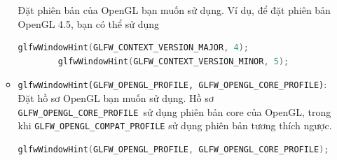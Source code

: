 \begin{enumerate}
\begin{itemize}
      Đặt phiên bản của OpenGL bạn muốn sử dụng. Ví dụ, để đặt phiên bản 
      OpenGL 4.5, bạn có thể sử dụng 
     \begin{lstlisting}[language=C++]
        glfwWindowHint(GLFW_CONTEXT_VERSION_MAJOR, 4);
        glfwWindowHint(GLFW_CONTEXT_VERSION_MINOR, 5);
     \end{lstlisting}
     \item \texttt{glfwWindowHint(GLFW\_OPENGL\_PROFILE,
      GLFW\_OPENGL\_CORE\_PROFILE)}:
      Đặt hồ sơ OpenGL bạn muốn sử dụng. Hồ sơ \texttt{ GLFW\_OPENGL\_CORE\_PROFILE 
      }sử dụng phiên bản core của OpenGL, 
      trong khi \texttt{GLFW\_OPENGL\_COMPAT\_PROFILE} sử dụng phiên bản tương thích
       ngược.
        \begin{lstlisting}[language=C++]
            glfwWindowHint(GLFW_OPENGL_PROFILE, GLFW_OPENGL_CORE_PROFILE);
        \end{lstlisting}
    \end{itemize}


\end{enumerate}
